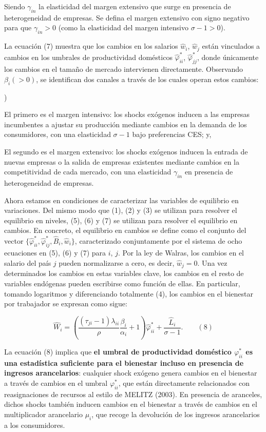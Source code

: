 \documentclass[10pt,a4paper]{article}
\newcounter{alphaitem}
\newenvironment{la}
      {\begin{list}{\alph{alphaitem})}{%
          \usecounter{alphaitem}%
          \setlength{\leftmargin}{1cm}%
          \setlength{\parskip}{3pt}%
          \setlength{\itemsep}{0pt}%
          \setlength{\parsep}{0pt}%
      }}
      {\end{list}}
\begin{document}
Siendo $\gamma_{in}$ la elasticidad del margen extensivo que surge en presencia de heterogeneidad de empresas. Se defina el margen extensivo con signo negativo para que $\gamma_{in}>0$ (como la elasticidad del margen intensivo $\sigma-1>0$).

La ecuación (7) muestra que los cambios en los salarios $\hat{w}_i$, $\hat{w}_j$ están vinculados a cambios en los umbrales de productividad domésticos $\hat{\varphi}_{ii}^*$, $\hat{\varphi}_{jj}^*$, donde únicamente los cambios en el tamaño de mercado intervienen directamente. Observando $\beta_i (> 0)$, se identifican dos canales a través de los cuales operan estos cambios:
\begin{la}
    \item El primero es el margen intensivo: los shocks exógenos inducen a las empresas incumbentes a ajustar su producción mediante cambios en la demanda de los consumidores, con una elasticidad $\sigma - 1$ bajo preferencias CES; y,
    \item El segundo es el margen extensivo: los shocks exógenos inducen la entrada de nuevas empresas o la salida de empresas existentes mediante cambios en la competitividad de cada mercado, con una elasticidad $\gamma_{in}$ en presencia de heterogeneidad de empresas.
\end{la}

Ahora estamos en condiciones de caracterizar las variables de equilibrio en variaciones. Del mismo modo que (1), (2) y (3) se utilizan para resolver el equilibrio en niveles, (5), (6) y (7) se utilizan para resolver el equilibrio en cambios. En concreto, el equilibrio en cambios se define como el conjunto del vector $\{\hat{\varphi}_{ii}^*, \hat{\varphi}_{ij}^*, \hat{B}_i, \hat{w}_i\}$, caracterizado conjuntamente por el sistema de ocho ecuaciones en (5), (6) y (7) para $i$, $j$. Por la ley de Walras, los cambios en el salario del país $j$ pueden normalizarse a cero, es decir, $\hat{w}_j = 0$. Una vez determinados los cambios en estas variables clave, los cambios en el resto de variables endógenas pueden escribirse como función de ellas. En particular, tomando logaritmos y diferenciando totalmente (4), los cambios en el bienestar por trabajador se expresan como sigue:

$$\hat{W}_i =\left(\frac{(\tau_{ji}-1)\lambda_{ii}}{\rho}\frac{\beta_i}{\alpha_i}+1\right)\hat{\varphi}_{ii}^*+ \frac{\hat{L}_i}{\sigma-1}.\qquad (8)$$

La ecuación (8) implica que \textbf{el umbral de productividad doméstico $\varphi_{ii}^*$ es una estadística suficiente para el bienestar incluso en presencia de ingresos arancelarios}: cualquier shock exógeno genera cambios en el bienestar a través de cambios en el umbral $\varphi_{ii}^*$, que están directamente relacionados con reasignaciones de recursos al estilo de MELITZ (2003). En presencia de aranceles, dichos shocks también inducen cambios en el bienestar a través de cambios en el multiplicador arancelario $\mu_i$, que recoge la devolución de los ingresos arancelarios a los consumidores. 
\end{document}

